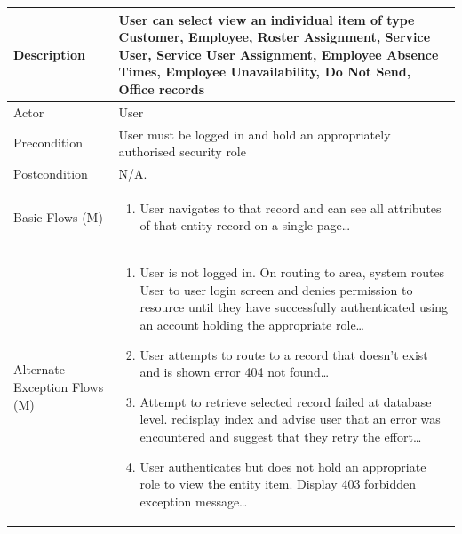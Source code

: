 \documentclass[a4paper,12pt]{article}
\newcommand\addrow[2]{#1 &#2\\ }
\newcommand\addheading[2]{#1 &#2\\ \hline}
\newcommand\tabularhead{\begin{tabular}{lp{11cm}}
\hline
}
\newcommand\addmulrow[2]{ \begin{minipage}[t][][t]{3cm}#1\end{minipage}%
   &\begin{minipage}[t][][t]{11cm}
    \begin{enumerate} #2   \end{enumerate}
    \end{minipage}\\ }
\newenvironment{usecase}{\tabularhead}
{\hline\end{tabular}}
\begin{document}
\begin{samepage}
\begin{usecase}
  \addheading{Description}{User can select view an individual item of type Customer, Employee, Roster Assignment, Service User, Service User Assignment, Employee Absence Times, Employee Unavailability, Do Not Send, Office records}
  \addheading{Actor}{User} 
  \addrow{Precondition}{User must be logged in and hold an appropriately authorised security role}
  \addrow{Postcondition}{N/A.}
  \addmulrow{Basic Flows (M)}{\item User navigates to that record and can see all attributes of that entity record on a single page\ldots}
  \addmulrow{Alternate Exception Flows (M)}{\item User is not logged in. On routing to area, system routes User to user login screen and denies permission to resource until they have successfully authenticated using an account holding the appropriate role\ldots
                                   \item User attempts to route to a record that doesn't exist and is shown error 404 not found\ldots
                                   \item Attempt to retrieve selected record failed at database level. redisplay index and advise user that an error was encountered and suggest that they retry the effort\ldots
                                    \item User authenticates but does not hold an appropriate role to view the entity item. Display 403 forbidden exception message\ldots}

\end{usecase}


\end{samepage}
\end{document}
